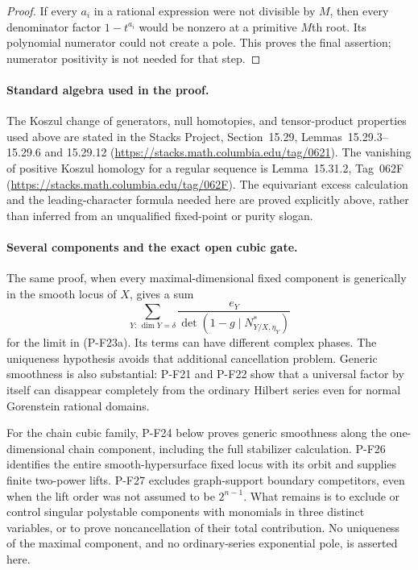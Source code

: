 \documentclass[11pt,a4paper]{article}
\begin{document}
\begin{proof}
If every $a_i$ in a rational expression were not divisible
by $M$, then every denominator factor $1-t^{a_i}$ would
be nonzero at a primitive $M$th root. Its polynomial numerator
could not create a pole. This proves the final assertion;
numerator positivity is not needed for that step.
\end{proof}

\paragraph{Standard algebra used in the proof.}
The Koszul change of generators, null homotopies, and tensor-product
properties used above are stated in the Stacks Project,
Section~15.29, Lemmas~15.29.3--15.29.6 and 15.29.12
(\url{https://stacks.math.columbia.edu/tag/0621}). The vanishing
of positive Koszul homology for a regular sequence is
Lemma~15.31.2, Tag~062F
(\url{https://stacks.math.columbia.edu/tag/062F}). The
equivariant excess calculation and the leading-character formula
needed here are proved explicitly above, rather than inferred
from an unqualified fixed-point or purity slogan.

\paragraph{Several components and the exact open cubic gate.}
The same proof, when every maximal-dimensional fixed component
is generically in the smooth locus of $X$, gives a sum
\[
 \sum_{Y:\,\dim Y=\delta}
       \frac{e_Y}{\det(1-g\mid N^*_{Y/X,\eta_Y})}
 \tag{P-F23g}
\]
for the limit in (P-F23a). Its terms can have different complex
phases. The uniqueness hypothesis avoids that additional
cancellation problem. Generic smoothness is also substantial:
P-F21 and P-F22 show that a universal factor by itself can
disappear completely from the ordinary Hilbert series even
for normal Gorenstein rational domains.

For the chain cubic family, P-F24 below proves generic smoothness
along the one-dimensional chain component, including the full
stabilizer calculation. P-F26 identifies the entire smooth-hypersurface
fixed locus with its orbit and supplies finite two-power lifts.
P-F27 excludes graph-support boundary competitors, even when the
lift order was not assumed to be $2^{n-1}$. What remains is to
exclude or control singular polystable components with monomials
in three distinct variables, or to prove noncancellation of their
total contribution. No uniqueness of the maximal component, and
no ordinary-series exponential pole, is asserted here.
\end{document}
